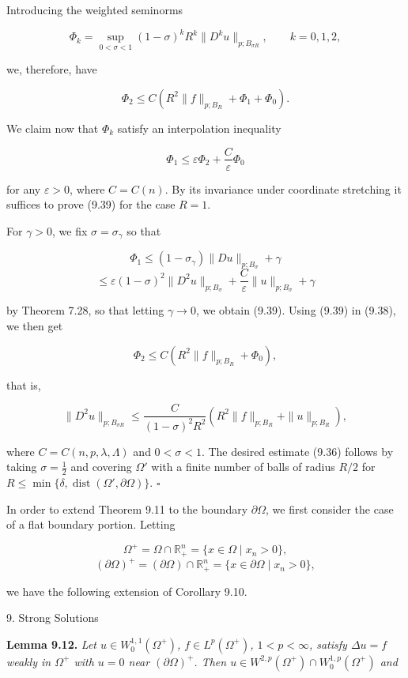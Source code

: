 
Introducing the weighted seminorms

\[
\Phi_k = \sup_{0<\sigma<1}(1-\sigma)^kR^k\|D^ku\|_{p;B_{\sigma R}}, \qquad k=0,1,2,
\]

we, therefore, have

\[
\tag{9.38}
\Phi_2 \leq C(R^2\|f\|_{p;B_R}+\Phi_1+\Phi_0).
\]

We claim now that $\Phi_k$ satisfy an interpolation inequality

\[
\tag{9.39}
\Phi_1 \leq \varepsilon \Phi_2 + \frac{C}{\varepsilon}\Phi_0
\]

for any $\varepsilon > 0$, where $C=C(n)$. By its invariance under coordinate stretching it
suffices to prove (9.39) for the case $R=1$.

For $\gamma > 0$, we fix $\sigma=\sigma_\gamma$ so that

\[
\Phi_1 \leq (1-\sigma_\gamma)\|Du\|_{p;B_\sigma}+\gamma
\]
\[
\leq \varepsilon(1-\sigma)^2\|D^2u\|_{p;B_\sigma}+\frac{C}{\varepsilon}\|u\|_{p;B_\sigma}+\gamma
\]

by Theorem 7.28, so that letting $\gamma\to 0$, we obtain (9.39). Using (9.39) in (9.38), we
then get

\[
\Phi_2 \leq C(R^2\|f\|_{p;B_R}+\Phi_0),
\]

that is,

\[
\tag{9.40}
\|D^2u\|_{p;B_{\sigma R}} \leq \frac{C}{(1-\sigma)^2R^2}\left(R^2\|f\|_{p;B_R}+\|u\|_{p;B_R}\right),
\]

where $C=C(n,p,\lambda,\Lambda)$ and $0<\sigma<1$.
The desired estimate (9.36) follows by taking $\sigma=\frac{1}{2}$ and covering $\Omega'$ with a
finite number of balls of radius $R/2$ for $R\leq \min\{\delta,\operatorname{dist}(\Omega',\partial\Omega)\}$. \(\square\)

In order to extend Theorem 9.11 to the boundary $\partial\Omega$, we first consider the case
of a flat boundary portion. Letting

\[
\Omega^+ = \Omega \cap \mathbb{R}_+^n = \{x\in \Omega\mid x_n > 0\},
\]
\[
(\partial\Omega)^+ = (\partial\Omega)\cap \mathbb{R}_+^n = \{x\in \partial\Omega\mid x_n > 0\},
\]

we have the following extension of Corollary 9.10.


 \hfill 9. Strong Solutions

\noindent \textbf{Lemma 9.12.} \textit{Let $u \in W^{1,1}_{0}(\Omega^+)$, $f \in L^p(\Omega^+)$, $1 < p < \infty$, satisfy $\Delta u = f$ weakly in $\Omega^+$ with $u = 0$ near $(\partial\Omega)^+$. Then $u \in W^{2,p}(\Omega^+) \cap W^{1,p}_0(\Omega^+)$ and}

